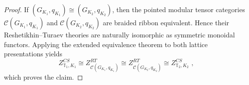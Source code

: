 \documentclass[10pt,a4paper]{amsart}
\begin{document}
\begin{proof}
If $(G_{K_1},q_{K_1})\cong (G_{K_2},q_{K_2})$, then the pointed modular tensor
categories $\mathcal C(G_{K_1},q_{K_1})$ and $
\mathcal C(G_{K_2},q_{K_2})$ are braided ribbon equivalent. Hence their  Reshetikhin--Turaev theories are naturally isomorphic as symmetric monoidal
functors. Applying the extended equivalence theorem to both lattice
presentations yields
\[
Z^{CS}_{\mathbb T_1,K_1}\cong Z^{RT}_{\mathcal C(G_{K_1},q_{K_1})}
\cong Z^{RT}_{\mathcal C(G_{K_2},q_{K_2})}
\cong Z^{CS}_{\mathbb T_2,K_2}\,\,,
\]
which proves the claim.
\end{proof}
\end{document}
